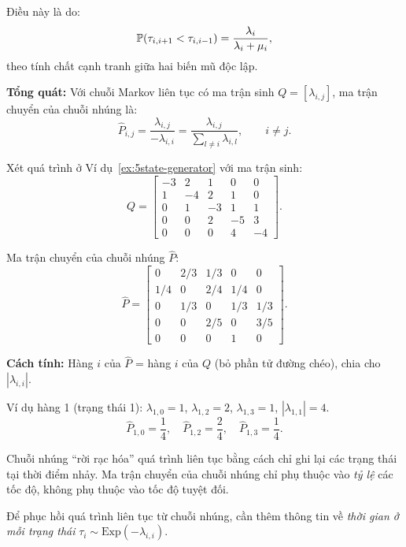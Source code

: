 Điều này là do:
\[
  \mathbb{P}(\tau_{i,i+1} < \tau_{i,i-1}) = \frac{\lambda_i}{\lambda_i + \mu_i},
\]
theo tính chất cạnh tranh giữa hai biến mũ độc lập.

\textbf{Tổng quát:} Với chuỗi Markov liên tục có ma trận sinh $Q = [\lambda_{i,j}]$,
ma trận chuyển của chuỗi nhúng là:
\begin{equation}\label{eq:embedded-general}
  \hat{P}_{i,j} = \frac{\lambda_{i,j}}{-\lambda_{i,i}} = \frac{\lambda_{i,j}}{\sum_{l \neq i} \lambda_{i,l}}, \qquad i \neq j.
\end{equation}

\begin{example}
Xét quá trình ở Ví dụ~\ref{ex:5state-generator} với ma trận sinh:
\[
  Q = \begin{bmatrix}
    -3 & 2 & 1 & 0 & 0 \\
    1 & -4 & 2 & 1 & 0 \\
    0 & 1 & -3 & 1 & 1 \\
    0 & 0 & 2 & -5 & 3 \\
    0 & 0 & 0 & 4 & -4
  \end{bmatrix}.
\]

Ma trận chuyển của chuỗi nhúng $\hat{P}$:
\[
  \hat{P} = \begin{bmatrix}
    0 & 2/3 & 1/3 & 0 & 0 \\
    1/4 & 0 & 2/4 & 1/4 & 0 \\
    0 & 1/3 & 0 & 1/3 & 1/3 \\
    0 & 0 & 2/5 & 0 & 3/5 \\
    0 & 0 & 0 & 1 & 0
  \end{bmatrix}.
\]

\textbf{Cách tính:} Hàng $i$ của $\hat{P}$ = hàng $i$ của $Q$ (bỏ phần tử đường chéo), chia cho $|\lambda_{i,i}|$.

Ví dụ hàng 1 (trạng thái 1): $\lambda_{1,0} = 1$, $\lambda_{1,2} = 2$, $\lambda_{1,3} = 1$, $|\lambda_{1,1}| = 4$.
\[
  \hat{P}_{1,0} = \frac{1}{4}, \quad \hat{P}_{1,2} = \frac{2}{4}, \quad \hat{P}_{1,3} = \frac{1}{4}.
\]
\end{example}

\begin{tomtat}
Chuỗi nhúng ``rời rạc hóa'' quá trình liên tục bằng cách chỉ ghi lại các trạng thái tại thời điểm nhảy.
Ma trận chuyển của chuỗi nhúng chỉ phụ thuộc vào \emph{tỷ lệ} các tốc độ, không phụ thuộc vào tốc độ tuyệt đối.

Để phục hồi quá trình liên tục từ chuỗi nhúng, cần thêm thông tin về \emph{thời gian ở mỗi trạng thái}
$\tau_i \sim \text{Exp}(-\lambda_{i,i})$.
\end{tomtat}


